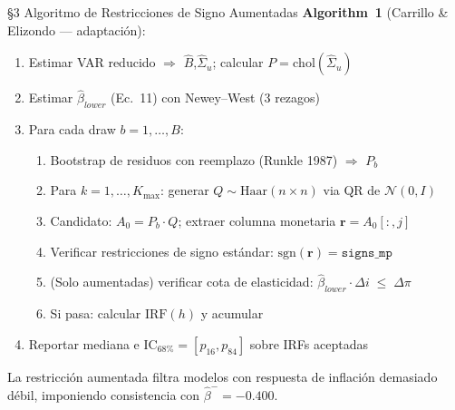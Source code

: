\documentclass[aspectratio=169,10pt]{beamer}
\begin{document}
\begin{frame}{\S3 Algoritmo de Restricciones de Signo Aumentadas}
\textbf{Algorithm~1} (Carrillo \& Elizondo --- adaptaci\'on):
\vspace{0.1cm}
\begin{enumerate}\small
  \item Estimar VAR reducido $\Rightarrow$ $\hat{B}$,\;$\hat{\Sigma}_u$;\;
        calcular $P=\mathrm{chol}(\hat{\Sigma}_u)$
  \item Estimar $\hat{\beta}_{lower}$ (Ec.~11) con Newey--West (3 rezagos)
  \item Para cada draw $b=1,\ldots,B$:
  \begin{enumerate}
    \item[(a)] Bootstrap de residuos con reemplazo (Runkle 1987) $\Rightarrow$ $P_b$
    \item[(b)] Para $k=1,\ldots,K_{\max}$: generar
               $Q\sim\mathrm{Haar}(n\times n)$ via QR de $\mathcal{N}(0,I)$
    \item[(c)] Candidato: $A_0=P_b\cdot Q$;\;
               extraer columna monetaria $\mathbf{r}=A_0[:,j]$
    \item[(d)] Verificar restricciones de signo est\'andar:
               $\mathrm{sgn}(\mathbf{r})=\mathtt{signs\_mp}$
    \item[(e)] \alert{(Solo aumentadas)} verificar cota de elasticidad:
               $\hat{\beta}_{lower}\cdot\Delta i\;\leq\;\Delta\pi$
    \item[(f)] Si pasa: calcular $\mathrm{IRF}(h)$ y acumular
  \end{enumerate}
  \item Reportar mediana e $\mathrm{IC}_{68\%}=[p_{16},p_{84}]$
        sobre IRFs aceptadas
\end{enumerate}
\vspace{0.1cm}
\small
\alert{La restricci\'on aumentada filtra modelos con respuesta de inflaci\'on
demasiado d\'ebil, imponiendo consistencia con $\hat{\beta}^-=-0.400$.}
\end{frame}
\end{document}
